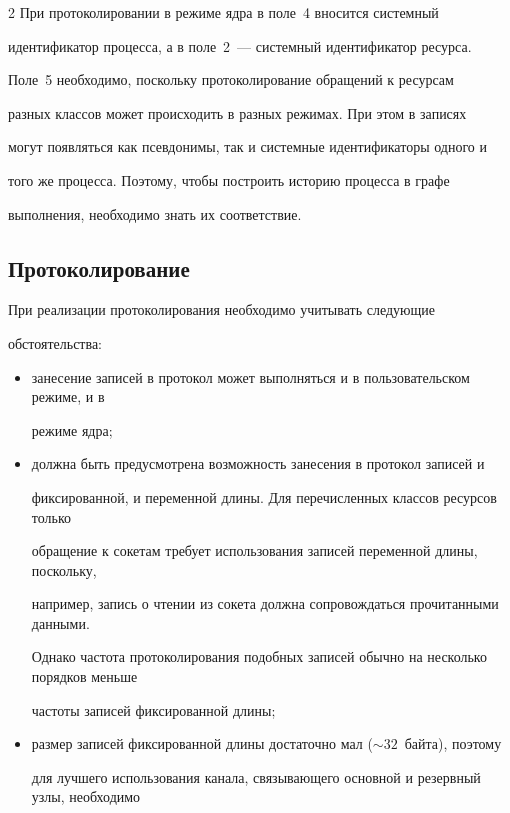 \begin{multicols}{2}
При протоколировании в режиме ядра в поле~4 вносится сис\-тем\-ный 

идентификатор процесса, а в поле~2~--- системный идентификатор ресурса.



Поле~5 необходимо, поскольку протоколирование обращений к ресурсам

разных классов может происходить в разных режимах. При этом в записях

могут появляться как псевдонимы, так и системные идентификаторы одного и

того же процесса. Поэтому, чтобы построить историю процесса в графе

выполнения, необходимо знать их соответствие.



\subsection*{Протоколирование}



При реализации протоколирования необходимо учитывать следующие

обстоятельства:

\begin{itemize}

\item занесение записей в протокол может выполняться и в пользовательском режиме, и в

режиме ядра;

\item должна быть предусмотрена возможность занесения в протокол записей и

фиксированной, и переменной длины. Для пере\-чис\-лен\-ных классов ресурсов только

обращение к сокетам требует использования записей переменной длины, поскольку,

например, запись о чтении из сокета должна сопровождаться прочитанными данными.

Однако частота протоколирования подобных записей обычно на несколько порядков меньше

частоты записей фиксированной длины;

\item размер записей фиксированной длины достаточно мал ($\sim 32$~байта), поэтому

для лучшего использования канала, свя\-зы\-ва\-юще\-го основной и резервный узлы, необходимо


\end{itemize}
\end{multicols}
